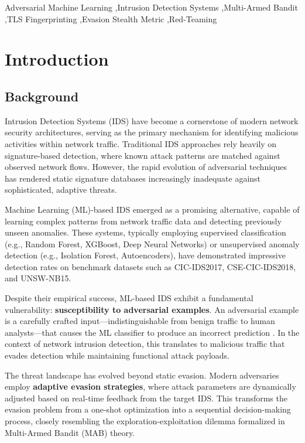 \documentclass[review]{elsarticle}
\begin{document}
\begin{frontmatter}
\begin{keyword}
Adversarial Machine Learning \sep Intrusion Detection Systems \sep Multi-Armed Bandit \sep TLS Fingerprinting \sep Evasion Stealth Metric \sep Red-Teaming
\end{keyword}

\end{frontmatter}

\linenumbers

\section{Introduction}
\label{sec:intro}

\subsection{Background}
Intrusion Detection Systems (IDS) have become a cornerstone of modern network security architectures, serving as the primary mechanism for identifying malicious activities within network traffic. Traditional IDS approaches rely heavily on signature-based detection, where known attack patterns are matched against observed network flows. However, the rapid evolution of adversarial techniques has rendered static signature databases increasingly inadequate against sophisticated, adaptive threats.

Machine Learning (ML)-based IDS emerged as a promising alternative, capable of learning complex patterns from network traffic data and detecting previously unseen anomalies. These systems, typically employing supervised classification (e.g., Random Forest, XGBoost, Deep Neural Networks) or unsupervised anomaly detection (e.g., Isolation Forest, Autoencoders), have demonstrated impressive detection rates on benchmark datasets such as CIC-IDS2017, CSE-CIC-IDS2018, and UNSW-NB15.

Despite their empirical success, ML-based IDS exhibit a fundamental vulnerability: \textbf{susceptibility to adversarial examples}. An adversarial example is a carefully crafted input—indistinguishable from benign traffic to human analysts—that causes the ML classifier to produce an incorrect prediction \cite{goodfellow2015explaining}. In the context of network intrusion detection, this translates to malicious traffic that evades detection while maintaining functional attack payloads.

The threat landscape has evolved beyond static evasion. Modern adversaries employ \textbf{adaptive evasion strategies}, where attack parameters are dynamically adjusted based on real-time feedback from the target IDS. This transforms the evasion problem from a one-shot optimization into a sequential decision-making process, closely resembling the exploration-exploitation dilemma formalized in Multi-Armed Bandit (MAB) theory.
\end{document}
